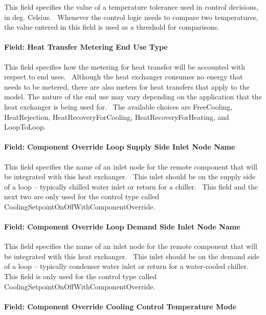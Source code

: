 This field specifies the value of a temperature tolerance used in control decisions, in deg. Celsius.~ Whenever the control logic needs to compare two temperatures, the value entered in this field is used as a threshold for comparisons.

\paragraph{Field: Heat Transfer Metering End Use Type}\label{field-heat-transfer-metering-end-use-type}

This field specifies how the metering for heat transfer will be accounted with respect to end uses.~ Although the heat exchanger consumes no energy that needs to be metered, there are also meters for heat transfers that apply to the model. The nature of the end use may vary depending on the application that the heat exchanger is being used for.~ The available choices are FreeCooling, HeatRejection, HeatRecoveryForCooling, HeatRecoveryForHeating, and LoopToLoop.

\paragraph{Field: Component Override Loop Supply Side Inlet Node Name}\label{field-component-override-loop-supply-side-inlet-node-name}

This field specifies the name of an inlet node for the remote component that will be integrated with this heat exchanger.~ This inlet should be on the supply side of a loop -- typically chilled water inlet or return for a chiller.~ This field and the next two are only used for the control type called CoolingSetpointOnOffWithComponentOverride.

\paragraph{Field: Component Override Loop Demand Side Inlet Node Name}\label{field-component-override-loop-demand-side-inlet-node-name}

This field specifies the name of an inlet node for the remote component that will be integrated with this heat exchanger.~ This inlet should be on the demand side of a loop -- typically condenser water inlet or return for a water-cooled chiller.~ This field is only used for the control type called CoolingSetpointOnOffWithComponentOverride.

\paragraph{Field: Component Override Cooling Control Temperature Mode}\label{field-component-override-cooling-control-temperature-mode}

